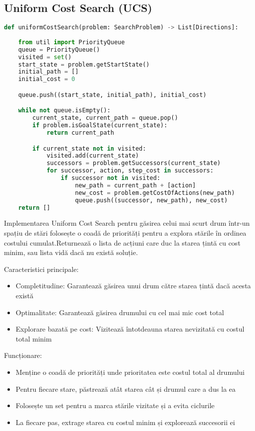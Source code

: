 \documentclass[12pt,a4paper]{article}
\begin{document}
\subsection{Uniform Cost Search (UCS)}
\begin{lstlisting}[language=Python]
def uniformCostSearch(problem: SearchProblem) -> List[Directions]:
   
    from util import PriorityQueue
    queue = PriorityQueue()
    visited = set()
    start_state = problem.getStartState()
    initial_path = []
    initial_cost = 0

    queue.push((start_state, initial_path), initial_cost)

    while not queue.isEmpty():
        current_state, current_path = queue.pop()
        if problem.isGoalState(current_state):
            return current_path

        if current_state not in visited:
            visited.add(current_state)
            successors = problem.getSuccessors(current_state)
            for successor, action, step_cost in successors:
                if successor not in visited:
                    new_path = current_path + [action]
                    new_cost = problem.getCostOfActions(new_path)
                    queue.push((successor, new_path), new_cost)
    return []
\end{lstlisting}

Implementarea Uniform Cost Search pentru găsirea celui mai scurt drum într-un spațiu de stări folosește o coadă de priorități pentru a explora stările în ordinea costului cumulat.Returnează o lista de acțiuni care duc la starea țintă cu cost minim, sau lista vidă dacă nu există soluție.

Caracteristici principale:
\begin{itemize}
	\item  Completitudine: Garantează găsirea unui drum către starea țintă dacă acesta există
  	\item  Optimalitate: Garantează găsirea drumului cu cel mai mic cost total
  	\item  Explorare bazată pe cost: Vizitează întotdeauna starea nevizitată cu costul total minim
\end{itemize}

Funcționare:
\begin{itemize}
  	\item Menține o coadă de priorități unde prioritatea este costul total al drumului
	\item Pentru fiecare stare, păstrează atât starea cât și drumul care a dus la ea
	\item Folosește un set pentru a marca stările vizitate și a evita ciclurile
	\item La fiecare pas, extrage starea cu costul minim și explorează succesorii ei
\end{itemize}
	
\end{document}
